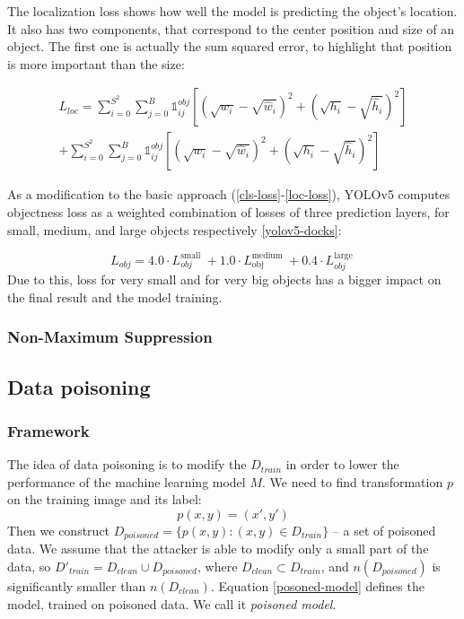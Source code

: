 \documentclass[14pt,a4paper]{extarticle}
\newcounter{e}
\numberwithin{equation}{section}
\numberwithin{figure}{section}
\begin{document}
The localization loss shows how well the model is predicting the object's location. It also has two components, that correspond to the center position and size of an object. The first one is actually the sum squared error, to highlight that position is more important than the size:

\begin{equation}
\begin{aligned}
\label{loc-loss}
L_{l o c} = \sum_{i=0}^{S^2} \sum_{j=0}^B \mathds{1}_{i j}^{o b j}\left[\left(\sqrt{w_i}-\sqrt{\widehat{w}_i}\right)^2+\left(\sqrt{h_i}-\sqrt{\widehat{h}_i}\right)^2\right]
\\
+ \sum_{i=0}^{S^2} \sum_{j=0}^B \mathds{1}_{i j}^{o b j}\left[\left(\sqrt{w_i}-\sqrt{\widehat{w}_i}\right)^2+\left(\sqrt{h_i}-\sqrt{\widehat{h}_i}\right)^2\right]
\end{aligned}
\end{equation}


As a modification to the basic approach (\ref{cls-loss}-\ref{loc-loss}), YOLOv5 computes objectness loss as a weighted combination of losses of three prediction layers, for small, medium, and large objects respectively \ref{yolov5-docks}:

\begin{equation}
L_{o b j}=4.0 \cdot L_{o b j}^{\text {small }}+1.0 \cdot L_{\text {obj }}^{\text {medium }}+0.4 \cdot L_{o b j}^{\text {large }}
\end{equation}
Due to this, loss for very small and for very big objects has a bigger impact on the final result and the model training.


\subsubsection{Non-Maximum Suppression}

\subsection{Data poisoning}

\subsubsection{Framework}

The idea of data poisoning is to modify the $D_{train}$ in order to lower the performance of the machine learning model $M$. We need to find transformation $p$ on the training image and its label:
\begin{equation}
    \label{poisonin}
    p(x, y) = (x', y')
\end{equation}
Then we construct $D_{poisoned}=\{p(x, y) : (x, y) \in D_{train}\}$ -- a set of poisoned data. We assume that the attacker is able to modify only a small part of the data, so $D'_{train} = D_{clean} \cup D_{poisoned}$, where $D_{clean} \subset D_{train}$, and $n(D_{poisoned})$ is significantly smaller than $n(D_{clean})$. Equation \ref{posoned-model} defines the model, trained on poisoned data. We call it \textit{poisoned model}.
\end{document}
